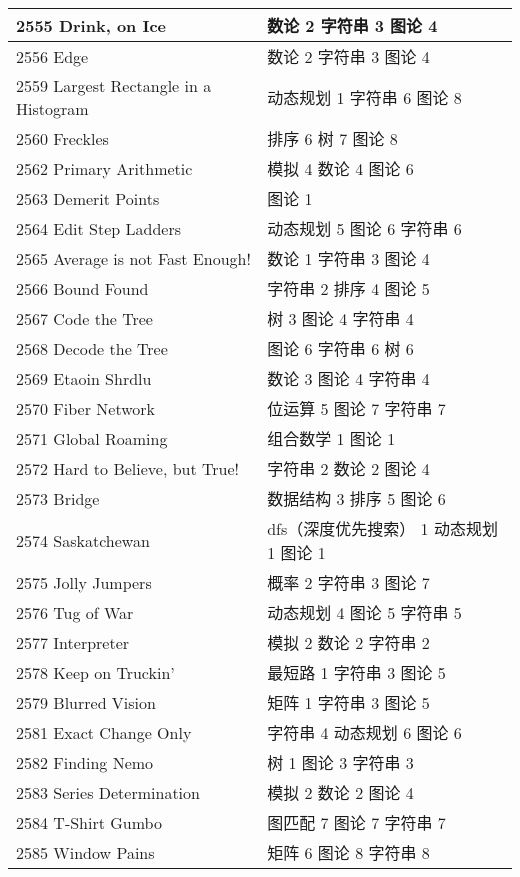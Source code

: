 \begin{longtable}{| p{} | p{} |}
 2555 Drink, on Ice  & 数论 2 字符串 3 图论 4 \\ \hline
 2556 Edge  & 数论 2 字符串 3 图论 4 \\ \hline
 2559 Largest Rectangle in a Histogram  & 动态规划 1 字符串 6 图论 8 \\ \hline
 2560 Freckles  & 排序 6 树 7 图论 8 \\ \hline
 2562 Primary Arithmetic  & 模拟 4 数论 4 图论 6 \\ \hline
 2563 Demerit Points  & 图论 1 \\ \hline
 2564 Edit Step Ladders  & 动态规划 5 图论 6 字符串 6 \\ \hline
 2565 Average is not Fast Enough!  & 数论 1 字符串 3 图论 4 \\ \hline
 2566 Bound Found  & 字符串 2 排序 4 图论 5 \\ \hline
 2567 Code the Tree  & 树 3 图论 4 字符串 4 \\ \hline
 2568 Decode the Tree  & 图论 6 字符串 6 树 6 \\ \hline
 2569 Etaoin Shrdlu  & 数论 3 图论 4 字符串 4 \\ \hline
 2570 Fiber Network  & 位运算 5 图论 7 字符串 7 \\ \hline
 2571 Global Roaming  & 组合数学 1 图论 1 \\ \hline
 2572 Hard to Believe, but True!  & 字符串 2 数论 2 图论 4 \\ \hline
 2573 Bridge  & 数据结构 3 排序 5 图论 6 \\ \hline
 2574 Saskatchewan  & dfs（深度优先搜索） 1 动态规划 1 图论 1 \\ \hline
 2575 Jolly Jumpers  & 概率 2 字符串 3 图论 7 \\ \hline
 2576 Tug of War  & 动态规划 4 图论 5 字符串 5 \\ \hline
 2577 Interpreter  & 模拟 2 数论 2 字符串 2 \\ \hline
 2578 Keep on Truckin'  & 最短路 1 字符串 3 图论 5 \\ \hline
 2579 Blurred Vision  & 矩阵 1 字符串 3 图论 5 \\ \hline
 2581 Exact Change Only  & 字符串 4 动态规划 6 图论 6 \\ \hline
 2582 Finding Nemo  & 树 1 图论 3 字符串 3 \\ \hline
 2583 Series Determination  & 模拟 2 数论 2 图论 4 \\ \hline
 2584 T-Shirt Gumbo  & 图匹配 7 图论 7 字符串 7 \\ \hline
 2585 Window Pains  & 矩阵 6 图论 8 字符串 8 \\ \hline

\end{longtable}
